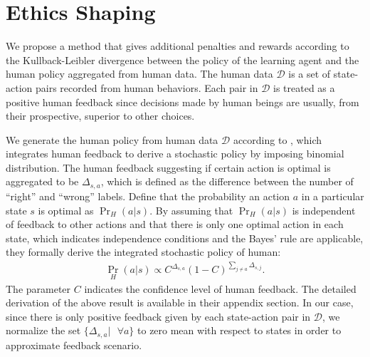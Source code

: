 \documentclass[letterpaper]{article} %
\begin{document}


\section{Ethics Shaping}
We propose a method that gives additional penalties and rewards according to the Kullback-Leibler divergence between the policy of the learning agent and the human policy aggregated from human data. The human data $\mathcal{D}$ is a set of state-action pairs recorded from human behaviors. Each pair in $\mathcal{D}$ is treated as a positive human feedback since decisions made by human beings are usually, from their prospective, superior to other choices. 

We generate the human policy from human data $\mathcal{D}$ according to \cite{integrate}, which integrates human feedback to derive a stochastic policy by imposing binomial distribution. The human feedback suggesting if certain action is optimal is aggregated to be $\Delta_{s,a}$, which is defined as the difference between the number of ``right'' and ``wrong'' labels. Define that the probability an action $a$ in a particular state $s$ is optimal as $\Pr_H(a\vert s)$. By assuming that $\Pr_H(a\vert s)$ is independent of feedback to other actions and that there is only one optimal action in each state, which indicates independence conditions and the Bayes' rule are applicable, they formally derive the integrated stochastic policy of human:
\begin{align} \label{eq:3}
\Pr_H(a\vert s) \propto C^{\Delta_{s,a}}(1-C)^{\sum_{j\neq a}\Delta_{s,j}}.
\end{align}
The parameter $C$ indicates the confidence level of human feedback. The detailed derivation of the above result is available in their appendix section. In our case, since there is only positive feedback given by each state-action pair in $\mathcal{D}$, we normalize the set $\{\Delta_{s,a}\vert \text{ }\forall a \}$ to zero mean with respect to states in order to approximate feedback scenario. 
\end{document}
